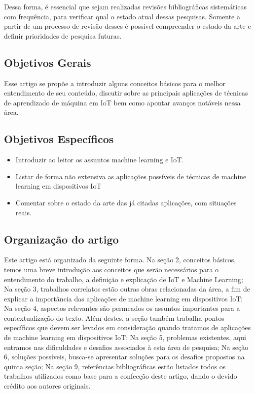 \documentclass[12pt]{article}
\begin{document}
Dessa forma, é essencial que sejam realizadas revisões bibliográficas sistemáticas com frequência, para verificar qual o estado atual dessas pesquisas. Somente a partir de um processo de revisão desses é possível compreender o estado da arte e definir prioridades de pesquisa futuras.

\subsection{Objetivos Gerais}

Esse artigo se propõe a introduzir alguns conceitos básicos para o melhor entendimento de seu conteúdo, discutir sobre as principais aplicações de técnicas de aprendizado de máquina em IoT bem como apontar avanços notáveis nessa área.

\subsection{Objetivos Específicos}

\begin{itemize}
    \item Introduzir ao leitor os assuntos machine learning e IoT.
    \item Listar de forma não extensiva as aplicações possíveis de técnicas de machine learning em dispositivos IoT
    \item Comentar sobre o estado da arte das já citadas aplicações, com situações reais. 
\end{itemize}

\subsection{Organização do artigo}

Este artigo está organizado da seguinte forma. Na seção 2, conceitos básicos, temos uma breve introdução aos conceitos que serão necessários para o entendimento do trabalho, a definição e explicação de IoT e Machine Learning; Na seção 3, trabalhos correlatos estão outras obras relacionadas da área, a fim de explicar a importância das aplicações de machine learning em dispositivos IoT; Na seção 4, aspectos relevantes são permeados os assuntos importantes para a contextualização do texto. Além destes, a seção também trabalha pontos específicos que devem ser levados em consideração quando tratamos de aplicações de machine learning em dispositivos IoT; Na seção 5, problemas existentes, aqui entramos nas dificuldades e desafios associados à esta área de pesquisa; Na seção 6, soluções possíveis, busca-se apresentar soluções para os desafios propostos na quinta seção; Na seção 9, referências bibliográficas estão listados todos os trabalhos utilizados como base para a confecção deste artigo, dando o devido crédito aos autores originais.
\end{document}
